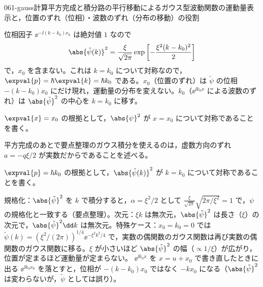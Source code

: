 \documentclass[uplatex,dvipdfmx,a4paper,11pt]{jsarticle}
\begin{document}
\begin{mondai}{061-gauss}{計算}{平方完成と積分路の平行移動によるガウス型波動関数の運動量表示と，位置のずれ（位相）・波数のずれ（分布の移動）の役割}
\begin{tadashii}
 位相因子 $\ee^{-\ii(k-k_{0})x_{0}}$ は絶対値 $1$ なので
\[ \abs{\tilde{\psi}(k)}^{2}=\frac{\xi}{\sqrt{2\pi}}\exp\left[-\frac{\xi^{2}(k-k_{0})^{2}}{2}\right] \]
で，$x_{0}$ を含まない。これは $k=k_{0}$ について対称なので，$\expval{p}=\hbar\expval{k}=\hbar k_{0}$ である。$x_{0}$（位置のずれ）は $\tilde{\psi}$ の位相 $-(k-k_{0})x_{0}$ にだけ現れ，運動量の分布を変えない。$k_{0}$（$\ee^{\ii k_{0}x}$ による波数のずれ）は $\abs{\tilde{\psi}}^{2}$ の中心を $k=k_{0}$ に移す。
\begin{ronten}
  \item {} $\expval{x}=x_{0}$ の根拠として，$\abs{\psi}^{2}$ が $x=x_{0}$ について対称であることを書く。
  \item {} 平方完成のあとで要点整理のガウス積分を使えるのは，虚数方向のずれ $a=-q\xi/2$ が実数だからであることを述べる。
  \item {} $\expval{p}=\hbar k_{0}$ の根拠として，$\abs{\tilde{\psi}(k)}^{2}$ が $k=k_{0}$ について対称であることを書く。
\end{ronten}
\kenzan 規格化：$\abs{\tilde{\psi}}^{2}$ を $k$ で積分すると，$\alpha=\xi^{2}/2$ として $\frac{\xi}{\sqrt{2\pi}}\sqrt{2\pi/\xi^{2}}=1$ で，$\psi$ の規格化と一致する（要点整理）。次元：$\xi k$ は無次元，$\abs{\tilde{\psi}}^{2}$ は長さ（$\xi$）の次元で，$\abs{\tilde{\psi}}^{2}\dd k$ は無次元。特殊ケース：$x_{0}=k_{0}=0$ では $\tilde{\psi}(k)=(\xi^{2}/(2\pi))^{1/4}\ee^{-\xi^{2}k^{2}/4}$ で，実数の偶関数のガウス関数は再び実数の偶関数のガウス関数に移る。$\xi$ が小さいほど $\abs{\tilde{\psi}}^{2}$ の幅（$\propto1/\xi$）が広がり，位置が定まるほど運動量が定まらない。
\tsumazuki $\ee^{\ii k_{0}x}$ を $x=u+x_{0}$ で書き直したときに出る $\ee^{\ii k_{0}x_{0}}$ を落とすと，位相が $-(k-k_{0})x_{0}$ ではなく $-kx_{0}$ になる（$\abs{\tilde{\psi}}^{2}$ は変わらないが，$\tilde{\psi}$ としては誤り）。
\end{tadashii}
\end{mondai}
\end{document}
